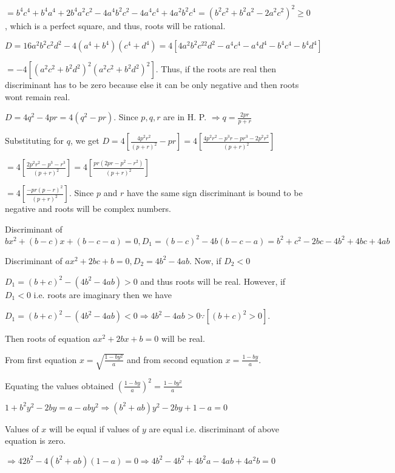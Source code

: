   $= b^4c^4 + b^4a^4 + 2b^4a^2c^2 - 4a^4b^2c^2 - 4a^4c^4 + 4a^2b^2c^4 = (b^2c^2 + b^2a^2 - 2a^2c^2)^2 \geq
  0$, which is a perfect square, and thus, roots will be rational.
\item $D = 16a^2b^2c^2d^2 - 4(a^4 + b^4)(c^4 + d^4) = 4[4a^2b^2c^22d^2 - a^4c^4 - a^4d^4 - b^4c^4 - b^4d^4]$

  $= -4[(a^2c^2 + b^2d^2)^2(a^2c^2 + b^2d^2)^2]$. Thus, if the roots are real then discriminant has to be
  zero because else it can be only negative and then roots wont remain real.
\item $D = 4q^2 - 4pr = 4(q^2 - pr)$. Since $p, q, r$ are in H. P. $\Rightarrow q = \frac{2pr}{p + r}$

  Substituting for $q$, we get $D = 4\left[\frac{4p^2r^2}{(p + r)^2} - pr\right] = 4\left[\frac{4p^2r^2 -
      p^3r - pr^3 - 2p^2r^2}{(p + r)^2}\right]$

  $= 4\left[\frac{2p^2r^2 - p^3 - r^3}{(p + r)^2}\right] = 4\left[\frac{pr(2pr - p^2 - r^2)}{(p + r)^2}\right]$

  $= 4\left[\frac{-pr(p - r)^2}{(p + r)^2}\right]$. Since $p$ and $r$ have the same sign discriminant is
  bound to be negative and roots will be complex numbers.
\item Discriminant of $bx^2 + (b - c)x + (b - c - a) = 0, D_1 = (b - c)^2 -4b(b - c - a) = b^2 + c^2 -2bc -4b^2 + 4bc + 4ab$

  Discriminant of $ax^2 + 2bc + b = 0, D_2 = 4b^2 - 4ab$. Now, if $D_2 < 0$

  $D_1 = (b + c)^2 - (4b^2 - 4ab) > 0$ and thus roots will be real. However, if $D_1 < 0$ i.e. roots are imaginary then we have

  $D_1 = (b + c)^2 - (4b^2 - 4ab) < 0 \Rightarrow 4b^2 - 4ab > 0 \because [(b + c)^2 > 0]$.

  Then roots of equation $ax^2 + 2bx + b = 0$ will be real.
\item From first equation $x = \sqrt{\frac{1 - by^2}{a}}$ and from second equation $x = \frac{1 - by}{a}$.

  Equating the values obtained $\left(\frac{1 - by}{a}\right)^2 = \frac{1 - by^2}{a}$

  $1 + b^2y^2 - 2by = a - aby^2 \Rightarrow (b^2 + ab)y^2 - 2by + 1 - a = 0$

  Values of $x$ will be equal if values of $y$ are equal i.e. discriminant of above equation is zero.

  $\Rightarrow 42b^2 - 4(b^2 + ab)(1 - a) = 0 \Rightarrow  4b^2 - 4b^2 + 4b^2a - 4ab + 4a^2b = 0$

